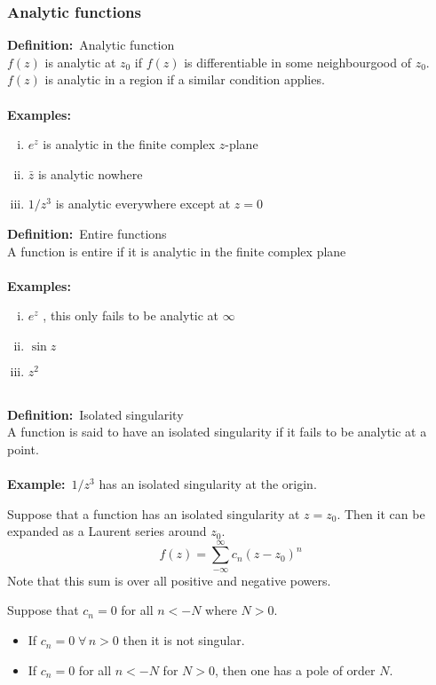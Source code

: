 \documentclass{article}
\newcommand{\definition}{\textbf{Definition:}}
\newcommand{\example}{\textbf{Example:}}
\newcommand{\examples}{\textbf{Examples:}}
\begin{document}
\subsubsection*{Analytic functions}
\definition\ Analytic function
\\
$f(z)$ is analytic at $z_0$ if $f(z)$ is differentiable in some neighbourgood
of $z_0$. $f(z)$ is analytic in a region if a similar condition applies.
\\
\\
\examples\
\begin{enumerate}[(i)]
\item $e^z$  is analytic in the finite complex $z$-plane
\item $\bar{z}$ is analytic nowhere
\item $1/z^3$ is analytic everywhere except at $z=0$
\end{enumerate}
\noindent \definition\ Entire functions
\\
A function is entire if it is analytic in the finite complex plane
\\
\\
\examples\
\begin{enumerate}[(i)]
\item $e^z$ , this only fails to be analytic at $\infty$ 
\item $\sin z$ 
\item $z^2$ 
\end{enumerate}
~\\
\definition\ Isolated singularity
\\
A function is said to have an isolated singularity if it fails to
be analytic at a point.
\\
\\
\example\ $1/z^3$ has an isolated singularity at the origin.
\\
\begin{framed}
\noindent Suppose that a function has an isolated singularity at $z=z_0$. Then
it can be expanded as a Laurent series around $z_0$.
\[ f(z) = \sum_{-\infty}^{\infty} c_n (z - z_0)^n \]
Note that this sum is over all positive and negative powers.
\end{framed}
\noindent
Suppose that $c_n=0$ for all $n< -N$ where $N>0$. 
\begin{itemize}
\item If $c_n = 0 \; \forall \, n >0$ then it is not singular.
\item If $c_n = 0$ for all $n<-N$ for $N>0$, then one has a pole of order
	$N$.
\end{itemize}
\end{document}
